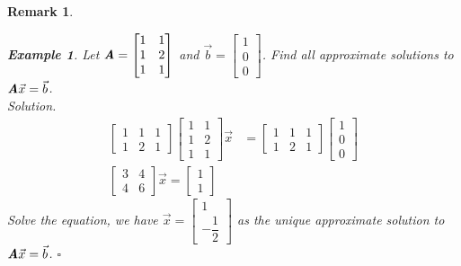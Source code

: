 \documentclass[12pt, a4paper]{article}
\newtheorem{eg}{Example}[subsection]
\newenvironment*{sol}{\indent\textit{Solution. }}{\hfill{$\square$}\par}
\newtheorem*{rmk}{\indent Remark}
\def\vecx{\vec{x}}
\def\vecb{\vec{b}}
\def\matrixA{\textbf{\emph{A}}}
\begin{document}
\begin{rmk}
	\begin{eg}
		Let $\matrixA=\begin{bmatrix}1&1\\1&2\\1&1\end{bmatrix}$ and $\vecb=\begin{bmatrix}1\\0\\0\end{bmatrix}$. Find all approximate solutions to $\matrixA\vecx=\vecb$.\\ 
		\begin{sol}
			$$\begin{aligned}
				\begin{bmatrix}1&1&1\\1&2&1\end{bmatrix}\begin{bmatrix}1&1\\1&2\\1&1\end{bmatrix}\vecx&=\begin{bmatrix}1&1&1\\1&2&1\end{bmatrix}\begin{bmatrix}1\\0\\0\end{bmatrix}\\
				\begin{bmatrix}3&4\\4&6\end{bmatrix}\vecx=\begin{bmatrix}1\\1\end{bmatrix}
			\end{aligned}$$
			Solve the equation, we have $\vecx=\begin{bmatrix}1\\-\dfrac{1}{2}\end{bmatrix}$ as the unique approximate solution to $\matrixA\vecx=\vecb$.
		\end{sol}
	\end{eg}
\end{rmk}
\end{document}
